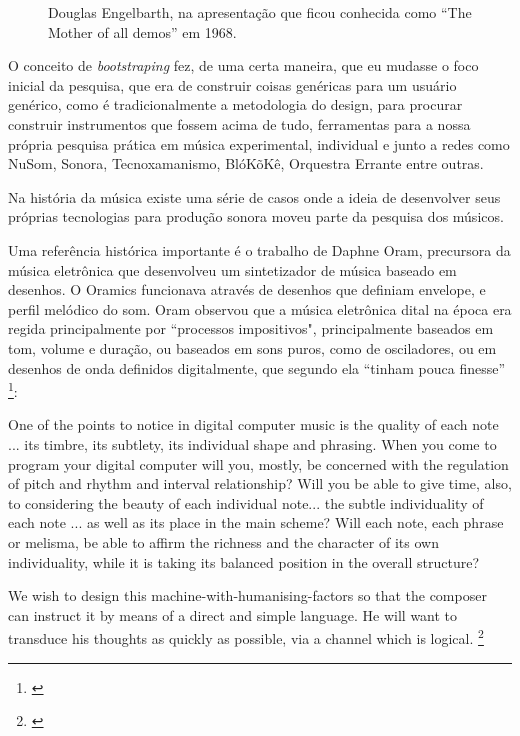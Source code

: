 \begin{figure}
    \caption{\label{motherofalldemos}Douglas Engelbarth, na apresentação que ficou conhecida como ``The Mother of all demos'' em 1968.}
    
    
\end{figure}



O conceito de \emph{bootstraping} fez, de uma certa maneira, que eu mudasse o foco inicial da pesquisa, que era de construir coisas genéricas para um usuário genérico, como é tradicionalmente a metodologia do design, para procurar construir instrumentos que fossem acima de tudo, ferramentas para a nossa própria pesquisa prática em música experimental, individual e junto a redes como NuSom, Sonora, Tecnoxamanismo, BlóKõKê, Orquestra Errante entre outras.

Na história da música existe uma série de casos onde a ideia de desenvolver seus próprias tecnologias para produção sonora moveu parte da pesquisa dos músicos.

Uma referência histórica importante é o trabalho de Daphne Oram, precursora da música eletrônica que desenvolveu um sintetizador de música baseado em desenhos. O Oramics funcionava através de desenhos que definiam envelope, e perfil melódico do som. Oram observou que a música eletrônica dital na época era regida principalmente por ``processos impositivos", principalmente baseados em tom, volume e duração, ou baseados em sons puros, como de osciladores, ou em desenhos de onda definidos digitalmente, que segundo ela ``tinham pouca finesse'' \footnote{\cite[101]{Oram1972}}: 

\begin{citacao}
One of the points to notice in digital computer music is the
quality of each note ... its timbre, its subtlety, its individual shape and phrasing. When you come to program your digital computer will you, mostly, be concerned with the regulation of pitch and rhythm and interval relationship? Will you be able to give time, also, to considering the beauty of each individual note... the subtle individuality of each note ... as well as its place in the main scheme? Will each note, each phrase or melisma, be able to affirm the richness and the character of its own individuality, while it is taking its balanced position in the overall structure? 

We wish to design this machine-with-humanising-factors so that the composer can instruct it by means of a direct and simple language. He will want to transduce his thoughts as quickly as possible, via a channel which is logical. \footnote{\cite[97]{Oram1972}}
\end{citacao}

